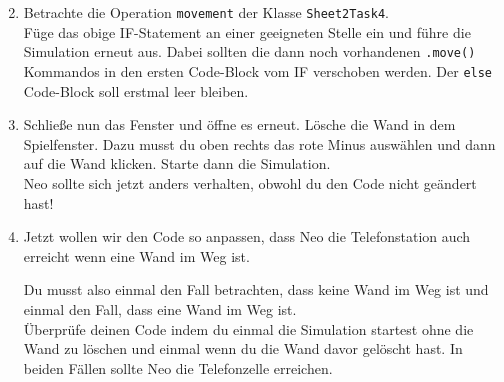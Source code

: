 \begin{enumerate} \setcounter{enumi}{1}
    \item Betrachte die Operation \lstinline{movement} der Klasse \lstinline{Sheet2Task4}.\\
        Füge das obige IF-Statement an einer geeigneten Stelle ein und führe die Simulation erneut aus.
        Dabei sollten die dann noch vorhandenen \lstinline{.move()} Kommandos in den ersten Code-Block vom IF verschoben werden.
        Der \lstinline{else} Code-Block soll erstmal leer bleiben.
    \item Schließe nun das Fenster und öffne es erneut.
        Lösche die Wand in dem Spielfenster.
        Dazu musst du oben rechts das rote Minus auswählen und dann auf die Wand klicken.
        Starte dann die Simulation.\\
        Neo sollte sich jetzt anders verhalten, obwohl du den Code nicht geändert hast!
    \item Jetzt wollen wir den Code so anpassen, dass Neo die Telefonstation auch erreicht wenn eine Wand im Weg ist.

        Du musst also einmal den Fall betrachten, dass keine Wand im Weg ist und einmal den Fall, dass eine Wand im Weg ist.\\

        Überprüfe deinen Code indem du einmal die Simulation startest ohne die Wand zu löschen und einmal wenn du die Wand davor gelöscht hast.
        In beiden Fällen sollte Neo die Telefonzelle erreichen.

\end{enumerate}
